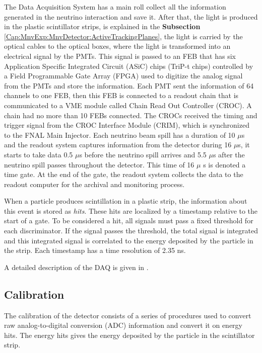 The Data Acquisition System has a main roll collect all the information generated in the neutrino interaction and save it. After that, the light is produced in the plastic scintillator strips, is explained in the \textbf{Subsection} \ref{Cap:MnvExp:MnvDetector:ActiveTrackingPlanes}, the light is carried by the optical cables to the optical boxes, where the light is transformed into an electrical signal by the PMTs. This signal is passed to an FEB that has six Application Specific Integrated Circuit (ASiC) chips (TriP-t chips)\cite{osti_1012682} controlled by a Field Programmable Gate Array (FPGA) used to digitize the analog signal from the PMTs and store the information. Each PMT sent the information of 64 channels to one FEB, then this FEB is connected to a readout chain that is communicated to a VME\cite{VMEModule} module called Chain Read Out Controller (CROC). A chain had no more than 10 FEBs connected. The CROCs received the timing and trigger signal from the CROC Interface Module (CRIM), which is synchronized to the FNAL Main Injector. Each neutrino beam spill has a duration of 10 $\mu$s and the readout system captures information from the detector during 16 $\mu$s, it starts to take data 0.5 $\mu$s before the neutrino spill arrives and 5.5 $\mu$s after the neutrino spill passes throughout the detector. This time of 16 $\mu$ s is denoted a time gate. At the end of the gate, the readout system collects the data to the readout computer for the archival and monitoring process.

When a particle produces scintillation in a plastic strip, the information about this event is stored as \textit{hits}. These hits are localized by a timestamp relative to the start of a gate. To be considered a hit, all signals must pass a fixed threshold for each discriminator. If the signal passes the threshold, the total signal is integrated and this integrated signal is correlated to the energy deposited by the particle in the strip. Each timestamp has a time resolution of 2.35 ns. 

A detailed description of the DAQ is given in \cite{DAQPERDUE2012179}.

\subsection{Calibration}
\label{Cap:MnvExp:MnvDetector:Calibration}

The calibration of the detector consists of a series of procedures used to convert raw analog-to-digital conversion (ADC) information and convert it on energy hits. The energy hits gives the energy deposited by the particle in the scintillator strip. 



